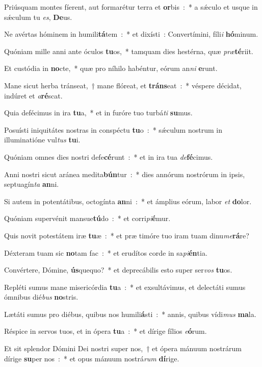 ﻿\item Priúsquam montes fíerent, aut formarétur terra et \textbf{or}bis~:~* a sǽculo et usque in sǽculum tu \emph{es}, \textbf{De}us.
\item Ne avértas hóminem in humili\textbf{tá}tem~:~* et dixísti~: Convertímini, fíli\emph{i} \textbf{hó}minum.
\item Quóniam mille anni ante óculos \textbf{tu}os,~* tamquam dies hestérna, quæ \emph{præ}\textbf{té}riit.
\item Et custódia in \textbf{no}cte,~* quæ pro níhilo habéntur, eórum an\emph{ni} \textbf{e}runt.
\item Mane sicut herba tránseat,~† mane flóreat, et \textbf{tráns}eat~:~* véspere décidat, indúret et \emph{a}\textbf{ré}scat.
\item Quia defécimus in ira \textbf{tu}a,~* et in furóre tuo turbá\emph{ti} \textbf{su}mus.
\item Posuísti iniquitátes nostras in conspéctu \textbf{tu}o~:~* sǽculum nostrum in illuminatióne vul\emph{tus} \textbf{tu}i.
\item Quóniam omnes dies nostri defe\textbf{cé}runt~:~* et in ira tua \emph{de}\textbf{fé}cimus.
\item Anni nostri sicut aránea medita\textbf{bún}tur~:~* dies annórum nostrórum in ipsis, septuagín\emph{ta} \textbf{an}ni.
\item Si autem in potentátibus, octogínta \textbf{an}ni~:~* et ámplius eórum, labor \emph{et} \textbf{do}lor.
\item Quóniam supervénit mansue\textbf{tú}do~:~* et corri\emph{pi}\textbf{é}mur.
\item Quis novit potestátem iræ \textbf{tu}æ~:~* et præ timóre tuo iram tuam dinu\emph{me}\textbf{rá}re?
\item Déxteram tuam sic \textbf{no}tam fac~:~* et erudítos corde in sa\emph{pi}\textbf{én}tia.
\item Convértere, Dómine, \textbf{ús}quequo?~* et deprecábilis esto super ser\emph{vos} \textbf{tu}os.
\item Repléti sumus mane misericórdia \textbf{tu}a~:~* et exsultávimus, et delectáti sumus ómnibus dié\emph{bus} \textbf{no}stris.
\item Lætáti sumus pro diébus, quibus nos humili\textbf{á}sti~:~* annis, quibus vídi\emph{mus} \textbf{ma}la.
\item Réspice in servos tuos, et in ópera \textbf{tu}a~:~* et dírige fílios \emph{e}\textbf{ó}rum.
\item Et sit splendor Dómini Dei nostri super nos,~† et ópera mánuum nostrárum dírige \textbf{su}per nos~:~* et opus mánuum nostrá\emph{rum} \textbf{dí}rige.
